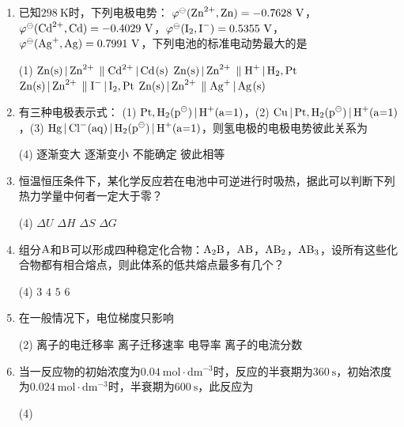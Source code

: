 \begin{enumerate}[label=\arabic*., itemsep=1.5ex]
\begin{tasks}
        \task $1/3$
        \task $1/4$
        \task $1/2$
        \task $3/4$
    \end{tasks}
    \item 已知$298\ \mathrm{K}$时，下列电极电势：
    $\varphi^\ominus(\ce{Zn^{2+}, Zn})=-0.7628\ \mathrm{V}$，$\varphi^\ominus(\ce{Cd^{2+}, Cd})=-0.4029\ \mathrm{V}$，$\varphi^\ominus(\ce{I2, I^-})=0.5355\ \mathrm{V}$，$\varphi^\ominus(\ce{Ag^+, Ag})=0.7991\ \mathrm{V}$，下列电池的标准电动势最大的是
    \begin{tasks}(1)
        \task $\ce{Zn(s) | Zn^{2+} \parallel Cd^{2+} | Cd(s)}$
        \task $\ce{Zn(s) | Zn^{2+} \parallel H^+ | H2, Pt}$
        \task $\ce{Zn(s) | Zn^{2+} \parallel I^- | I2, Pt}$
        \task $\ce{Zn(s) | Zn^{2+} \parallel Ag^+ | Ag(s)}$
    \end{tasks}
    \item 有三种电极表示式：
    (1) $\ce{Pt, H2(p^\ominus) | H+(a=1)}$，(2) $\ce{Cu | Pt, H2(p^\ominus) | H+(a=1)}$，(3) $\ce{Hg | Cl^-(aq) | H2(p^\ominus) | H+(a=1)}$，则氢电极的电极电势彼此关系为
    \begin{tasks}(4)
        \task 逐渐变大
        \task 逐渐变小
        \task 不能确定
        \task 彼此相等
    \end{tasks}
    \item 恒温恒压条件下，某化学反应若在电池中可逆进行时吸热，据此可以判断下列热力学量中何者一定大于零？
    \begin{tasks}(4)
        \task $\Delta U$
        \task $\Delta H$
        \task $\Delta S$
        \task $\Delta G$
    \end{tasks}
    \item 组分$\ce{A}$和$\ce{B}$可以形成四种稳定化合物：$\ce{A2B}$，$\ce{AB}$，$\ce{AB2}$，$\ce{AB3}$，设所有这些化合物都有相合熔点，则此体系的低共熔点最多有几个？
    \begin{tasks}(4)
        \task $3$
        \task $4$
        \task $5$
        \task $6$
    \end{tasks}
    \item 在一般情况下，电位梯度只影响
    \begin{tasks}(2)
        \task 离子的电迁移率
        \task 离子迁移速率
        \task 电导率
        \task 离子的电流分数
    \end{tasks}
    \item 当一反应物的初始浓度为$0.04\ \mathrm{mol\cdot dm^{-3}}$时，反应的半衰期为$360\ \mathrm{s}$，初始浓度为$0.024\ \mathrm{mol\cdot dm^{-3}}$时，半衰期为$600\ \mathrm{s}$，此反应为
    \begin{tasks}(4)

\end{tasks}
\end{enumerate}
